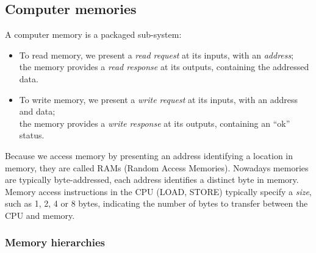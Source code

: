 \vspace{1ex}



\subsection{Computer memories}

\label{Sec_mem_split_phase}


A computer memory is a packaged sub-system:
\begin{itemize}

 \item To read memory, we present a \emph{read request} at its inputs,
       with an \emph{address}; \\
       the memory provides a \emph{read response} at its outputs,
       containing the addressed data.

 \item To write memory, we present a \emph{write request} at its
       inputs, with an address and data; \\
       the memory provides a \emph{write response} at its outputs,
       containing an ``ok'' status.

\end{itemize}


Because we access memory by presenting an address identifying a
location in memory, they are called RAMs (Random Access Memories).
Nowadays memories are typically byte-addressed, {\ie} each address
identifies a distinct byte in memory.  Memory access instructions in
the CPU (LOAD, STORE) typically specify a \emph{size}, such as 1, 2, 4
or 8 bytes, indicating the number of bytes to transfer between the CPU
and memory.


\subsubsection{Memory hierarchies}


